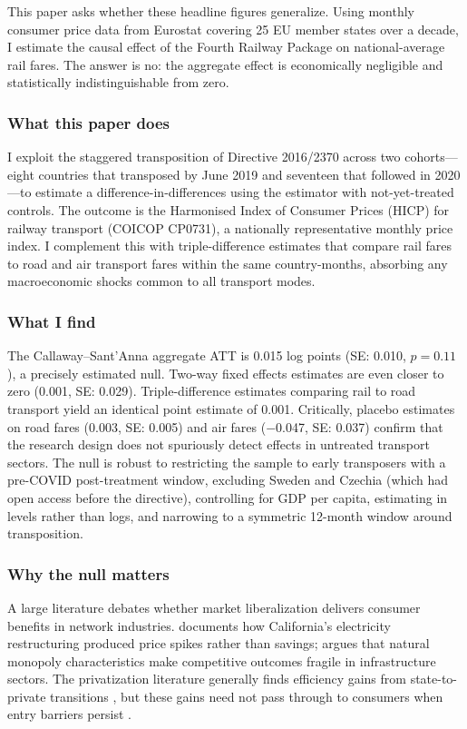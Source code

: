 \documentclass[12pt]{article}
\begin{document}
This paper asks whether these headline figures generalize. Using monthly consumer price data from Eurostat covering 25 EU member states over a decade, I estimate the causal effect of the Fourth Railway Package on national-average rail fares. The answer is no: the aggregate effect is economically negligible and statistically indistinguishable from zero.

\subsubsection*{What this paper does} I exploit the staggered transposition of Directive 2016/2370 across two cohorts---eight countries that transposed by June 2019 and seventeen that followed in 2020---to estimate a difference-in-differences using the \citet{callaway2021difference} estimator with not-yet-treated controls. The outcome is the Harmonised Index of Consumer Prices (HICP) for railway transport (COICOP CP0731), a nationally representative monthly price index. I complement this with triple-difference estimates that compare rail fares to road and air transport fares within the same country-months, absorbing any macroeconomic shocks common to all transport modes.

\subsubsection*{What I find} The Callaway--Sant'Anna aggregate ATT is 0.015 log points (SE: 0.010, $p = 0.11$), a precisely estimated null. Two-way fixed effects estimates are even closer to zero (0.001, SE: 0.029). Triple-difference estimates comparing rail to road transport yield an identical point estimate of 0.001. Critically, placebo estimates on road fares (0.003, SE: 0.005) and air fares ($-$0.047, SE: 0.037) confirm that the research design does not spuriously detect effects in untreated transport sectors. The null is robust to restricting the sample to early transposers with a pre-COVID post-treatment window, excluding Sweden and Czechia (which had open access before the directive), controlling for GDP per capita, estimating in levels rather than logs, and narrowing to a symmetric 12-month window around transposition.

\subsubsection*{Why the null matters} A large literature debates whether market liberalization delivers consumer benefits in network industries. \citet{borenstein2002trouble} documents how California's electricity restructuring produced price spikes rather than savings; \citet{joskow2007regulation} argues that natural monopoly characteristics make competitive outcomes fragile in infrastructure sectors. The privatization literature generally finds efficiency gains from state-to-private transitions \citep{megginson2001privatization, boycko1996theory, shleifer1998state}, but these gains need not pass through to consumers when entry barriers persist \citep{djankov2002regulation, stigler1971theory}.
\end{document}
